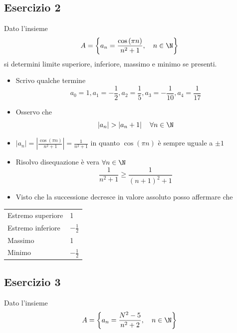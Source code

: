 \subsection{Esercizio 2}
Dato l'insieme
\[
	A = \left\{ a_n = \frac{\cos \left( \pi n  \right)}{n^2 + 1}, \quad n  \in \N  \right\}
\]
si determini limite superiore, inferiore, massimo e minimo se presenti.
\begin{itemize}
	\item Scrivo qualche termine  \[
		      a_0 = 1 , a_1 = -\frac{1}{2}, a_2= \frac{1}{5}, a_3 = -\frac{1}{10}, a_4=\frac{1}{17}
	      \]
	\item Osservo che \[
		      \left|a_n\right|> \left|a_n+1\right| \quad \forall n  \in  \N
	      \]
	\item $\left|a_n\right| = \left| \frac{\cos \left( \pi n \right) }{n^2 +1}\right|= \frac{1}{n^2 + 1}$ in quanto $\cos\left( \pi n \right) $ è sempre uguale a $\pm 1$
	\item Risolvo disequazione \rarr è vera $ \forall n  \in  \N$
	      \[
		      \frac{1}{n^2 +1} \ge \frac{1}{\left( n+1 \right) ^2 + 1}
	      \]
	\item Visto che la successione decresce in valore assoluto posso affermare che
\end{itemize}

\begin{table}[h!]
	\centering
	\begin{tabular}{|ll|}
		\hline
		Estremo superiore & 1              \\
		Estremo inferiore & $-\frac{1}{2}$ \\
		Massimo           & 1              \\
		Minimo            & $-\frac{1}{2}$ \\
		\hline
	\end{tabular}
\end{table}
\subsection{Esercizio 3}
Dato l'insieme
\[
	A = \left\{ a_n = \frac{N^2 - 5}{n^2 +2}, \quad  n  \in  \N \right\}
\]

